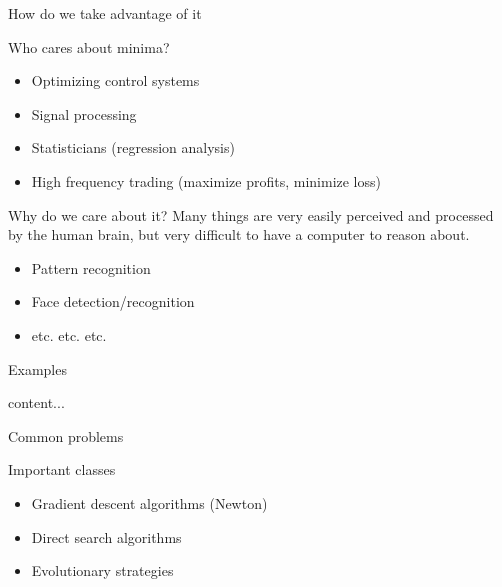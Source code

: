\documentclass[11pt,a4paper]{beamer}
\begin{document}
\begin{frame}{How do we take advantage of it}
\begin{block}{Who cares about minima?} \pause
\begin{itemize}
\item Optimizing control systems \pause
\item Signal processing \pause
\item Statisticians (regression analysis) \pause
\item High frequency trading (maximize profits, minimize loss) \pause
\end{itemize}
\end{block}
\begin{block}{Why do we care about it?}
Many things are very easily perceived and processed by the human brain, but very difficult to have a computer to reason about. \pause
\begin{itemize}
\item Pattern recognition \pause
\item Face detection/recognition \pause
\item etc. etc. etc. 
\end{itemize}
\end{block}

\end{frame}

\begin{block}{Examples}

content...
\end{block}

\begin{frame}{Common problems}
\begin{block}{Important classes}
\begin{itemize}
\item Gradient descent algorithms (Newton)
\item Direct search algorithms
\item Evolutionary strategies
\end{itemize}
\end{block}


\end{frame}
\end{document}
